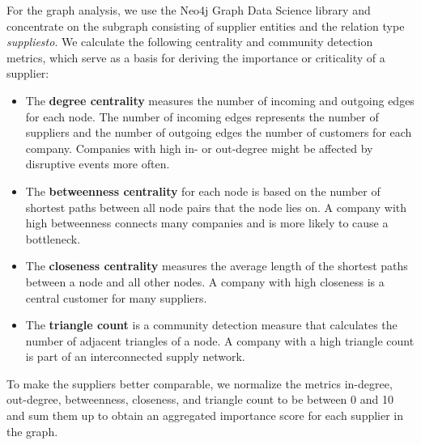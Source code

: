 \documentclass[
]{ceurart}
\begin{document}
For the graph analysis, we use the Neo4j Graph Data Science library and concentrate on the subgraph consisting of supplier entities and the relation type \textit{supplies\textunderscore to}. We calculate the following centrality and community detection metrics, which serve as a basis for deriving the importance or criticality of a supplier:
\begin{itemize}
    \item The   \textbf{degree centrality} measures the number of incoming and outgoing edges for each node. The number of incoming edges represents the number of suppliers and the number of outgoing edges the number of customers for each company. Companies with high in- or out-degree might be affected by disruptive events more often. 
    \item The \textbf{betweenness centrality} for each node is based on the number of shortest paths between all node pairs that the node lies on. A company with high betweenness connects many companies and is more likely to cause a bottleneck. 
    \item The \textbf{closeness centrality} measures the average length of the shortest paths between a node and all other nodes. A company with high closeness is a central customer for many suppliers.
    \item The \textbf{triangle count} is a community detection measure that calculates the number of adjacent triangles of a node. A company with a high triangle count is part of an interconnected supply network. 
\end{itemize}
To make the suppliers better comparable, we normalize the metrics in-degree, out-degree, betweenness, closeness, and triangle count to be between 0 and 10 and sum them up to obtain an aggregated importance score for each supplier in the graph.
\end{document}
